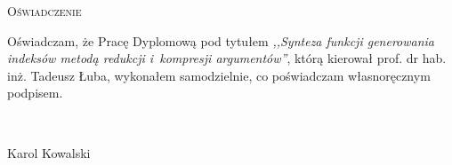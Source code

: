 \newpage
\thispagestyle{empty}


\begin{center}
\LARGE\textsc{Oświadczenie}
\end{center}

\vspace{1cm}

Oświadczam, że Pracę Dyplomową pod tytułem \emph{,,Synteza funkcji generowania indeksów metodą redukcji i~kompresji argumentów''}, którą kierował prof. dr hab. inż. Tadeusz Łuba, wykonałem samodzielnie, co poświadczam własnoręcznym podpisem.

\vspace{2cm}

\begin{flushright}
\begin{minipage}{5cm}
	\dotfill \\[-0.7cm]
	\begin{center}
	\small{Karol Kowalski}
	\end{center}
\end{minipage}
\end{flushright}

\cleardoublepage
